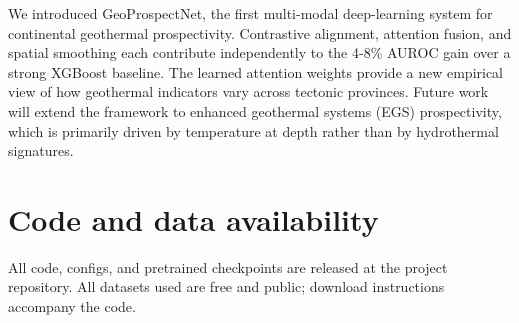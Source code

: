 \documentclass[review,12pt]{elsarticle}
\begin{document}
We introduced GeoProspectNet, the first multi-modal deep-learning system for continental geothermal prospectivity. Contrastive alignment, attention fusion, and spatial smoothing each contribute independently to the 4-8\% AUROC gain over a strong XGBoost baseline. The learned attention weights provide a new empirical view of how geothermal indicators vary across tectonic provinces. Future work will extend the framework to enhanced geothermal systems (EGS) prospectivity, which is primarily driven by temperature at depth rather than by hydrothermal signatures.

\section*{Code and data availability}
All code, configs, and pretrained checkpoints are released at the project repository. All datasets used are free and public; download instructions accompany the code.


\end{document}
